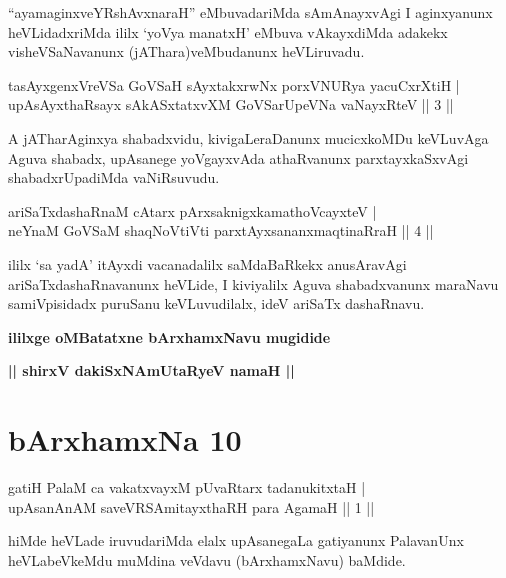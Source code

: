 \begin{artha}
``ayamaginxveYRshAvxnaraH'' eMbuvadariMda sAmAnayxvAgi I aginxyanunx heVLidadxriMda ililx `yoV\s ya manatxH' eMbuva vAkayxdiMda adakekx visheVSaNavanunx (jAThara)veMbudanunx heVLiruvadu.
\end{artha}


\begin{shl}
tasAyxgenxVreVSa GoVSaH sAyxtakxrwNx porxVNURya yacuCxrXtiH | \\
upAsAyxthaRsayx sAkASxtatxvXM GoVSarUpeVNa vaNayxRteV \hfill ||  3 || 
\end{shl}

\begin{artha}
A jATharAginxya shabadxvidu, kivigaLeraDanunx mucicxkoMDu keVLuvAga Aguva shabadx, upAsanege yoVgayxvAda athaRvanunx parxtayxkaSxvAgi shabadxrUpadiMda vaNiRsuvudu.
\end{artha}

\begin{shl}
ariSaTxdashaRnaM cAtarx pArxsaknigxkamathoVcayxteV | \\
neYnaM GoVSaM shaqNoVtiVti parxtAyxsananxmaqtinaRraH \hfill ||  4 || 
\end{shl}

\begin{artha}
ililx `sa yadA' itAyxdi vacanadalilx saMdaBaRkekx anusAravAgi ariSaTxdashaRnavanunx heVLide, I kiviyalilx Aguva shabadxvanunx maraNavu samiVpisidadx puruSanu keVLuvudilalx, ideV ariSaTx dashaRnavu.
\end{artha}

\begin{center}
{\bf ililxge oMBatatxne bArxhamxNavu mugidide}
\smallskip

{\bf || shirxV dakiSxNAmUtaRyeV namaH ||}
\end{center}

\section*{bArxhamxNa 10}


\begin{shl}
gatiH PalaM ca vakatxvayxM pUvaRtarx tadanukitxtaH | \\
upAsanAnAM saveVRSAmitayxthaRH para AgamaH \hfill ||  1 || 
\end{shl}

\begin{artha}
hiMde heVLade iruvudariMda elalx upAsanegaLa gatiyanunx PalavanUnx heVLabeVkeMdu muMdina veVdavu (bArxhamxNavu) baMdide.
\end{artha}

